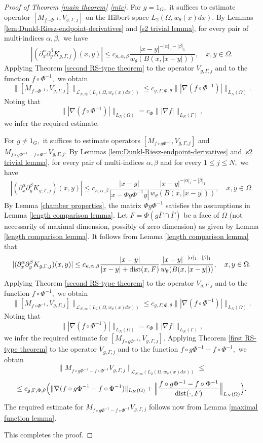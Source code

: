 \documentclass{amsart}
\begin{document}
\begin{proof}[Proof of Theorem \ref{main theorem} \eqref{mtc}]
For $g=1_G,$ it suffices to estimate operator $[M_{f\circ\Phi^{-1}},V_{g,\Gamma,j}]$ on the Hilbert space $L_2(\Omega,w_{\theta}(x)dx).$ By Lemmas \ref{lem:Dunkl-Riesz-endpoint-derivatives} and \ref{s2 trivial lemma}, for every pair of multi-indices $\alpha,\beta,$ we have
$$|(\partial_x^{\alpha}\partial_y^{\beta}K_{g,\Gamma,j})(x,y)|
\leq c_{\kappa,\alpha,\beta}\frac{|x-y|^{-|\alpha|_1-|\beta|_1}}{w_{\theta}(B(x,|x-y|))},\quad x,y\in\Omega.$$
Applying Theorem \ref{second RS-type theorem} to the operator $V_{g,\Gamma,j}$ and to the function $f\circ\Phi^{-1},$ we obtain 
$$\|[M_{f\circ\Phi^{-1}},V_{g,\Gamma,j}]\|_{\mathcal{L}_{N,\infty}(L_2(\Omega,w_{\theta}(x)dx))}\leq c_{g,\Gamma,\Phi,\theta}\||\nabla(f\circ\Phi^{-1})|\|_{L_N(\Omega)}.$$
Noting that 
$$\||\nabla(f\circ\Phi^{-1})|\|_{L_N(\Omega)}=c_{\Phi}\||\nabla f|\|_{L_N(\Gamma)},$$
we infer the required estimate.

For $g\neq 1_G,$ it suffices to estimate operators $[M_{f\circ g\Phi^{-1}},V_{g,\Gamma,j}]$ and $M_{f\circ g\Phi^{-1}-f\circ\Phi^{-1}}V_{g,\Gamma,j}.$ By Lemmas \ref{lem:Dunkl-Riesz-endpoint-derivatives} and \ref{s2 trivial lemma}, for every pair of multi-indices $\alpha,\beta$ and for every $1\leq j\leq N,$ we have
$$|(\partial_x^{\alpha}\partial_y^{\beta}K_{g,\Gamma,j})(x,y)|
\leq c_{\kappa,\alpha,\beta}\frac{|x-y|}{|x-\Phi g\Phi^{-1}y|}\frac{|x-y|^{-|\alpha|_1-|\beta|_1}}{w_{\theta}(B(x,|x-y|))},\quad x,y\in\Omega.$$
By Lemma \ref{chamber properties}, the matrix $\Phi g\Phi^{-1}$ satisfies the assumptions in Lemma \ref{length comparison lemma}. Let $F=\Phi(g\bar{\Gamma}\cap\bar{\Gamma})$ be a face of $\Omega$ (not necessarily of maximal dimension, possibly of zero dimension) as given by Lemma \ref{length comparison lemma}. It follows from Lemma \ref{length comparison lemma} that
$$|(\partial_x^{\alpha}\partial_y^{\beta}K_{g,\Gamma,j})(x,y)|
\leq c_{\kappa,\alpha,\beta}\frac{|x-y|}{|x-y|+{\rm dist}(x,F)}\frac{|x-y|^{-|\alpha|_1-|\beta|_1}}{w_{\theta}(B(x,|x-y|))},\quad x,y\in\Omega.$$
Applying Theorem \ref{second RS-type theorem} to the operator $V_{g,\Gamma,j}$ and to the function $f\circ\Phi^{-1},$ we obtain 
$$\|[M_{f\circ\Phi^{-1}},V_{g,\Gamma,j}]\|_{\mathcal{L}_{N,\infty}(L_2(\Omega,w_{\theta}(x)dx))}\leq c_{g,\Gamma,\Phi,\theta}\||\nabla(f\circ\Phi^{-1})|\|_{L_N(\Omega)}.$$
Noting that 
$$\||\nabla(f\circ\Phi^{-1})|\|_{L_N(\Omega)}=c_{\Phi}\||\nabla f|\|_{L_N(\Gamma)},$$
we infer the required estimate for $[M_{f\circ g\Phi^{-1}},V_{g,\Gamma,j}].$ Applying Theorem \ref{first RS-type theorem} to the operator $V_{g,\Gamma,j}$ and to the function $f\circ g\Phi^{-1}-f\circ\Phi^{-1},$ we obtain 
$$\|M_{f\circ g\Phi^{-1}-f\circ\Phi^{-1}}V_{g,\Gamma,j}\|_{\mathcal{L}_{N,\infty}(L_2(\Omega,w_{\theta}(x)dx))}\leq$$
$$\leq c_{g,\Gamma,\Phi,\theta}\Big(\|\nabla(f\circ g\Phi^{-1}-f\circ\Phi^{-1})\|_{L_N(\Omega)}+\Big\|\frac{f\circ g\Phi^{-1}-f\circ\Phi^{-1}}{{\rm dist}(\cdot,F)}\Big\|_{L_N(\Omega)}\Big).$$
The required estimate for $M_{f\circ g\Phi^{-1}-f\circ\Phi^{-1}}V_{g,\Gamma,j}$ follows now from Lemma \ref{maximal function lemma}.

This completes the proof.
\end{proof}
\end{document}
